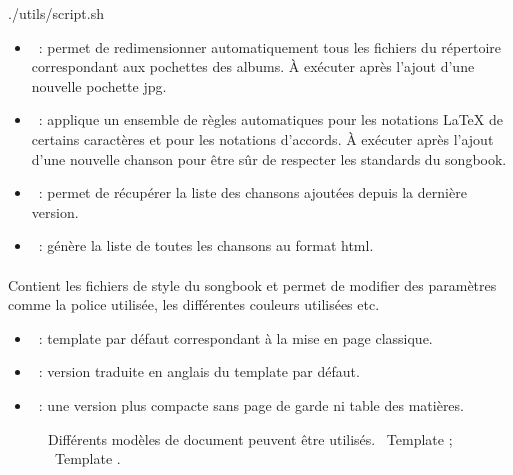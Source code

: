 \begin{unix}
  ./utils/script.sh
\end{unix}

\begin{itemize}
\item {}~: permet de redimensionner
  automatiquement tous les fichiers  du répertoire
   correspondant aux pochettes des albums. À
  exécuter après l'ajout d'une nouvelle pochette jpg.

\item {}~: applique un ensemble de règles
  automatiques pour les notations \LaTeX{} de certains caractères et
  pour les notations d'accords. À exécuter après l'ajout d'une
  nouvelle chanson pour être sûr de respecter les standards du
  songbook.

\item {}~: permet de récupérer la liste des
  chansons ajoutées depuis la dernière version.

\item {}~: génère la liste de toutes les chansons au
  format html.
\end{itemize}

\paragraph{}
Contient les fichiers de style du songbook et permet de modifier des
paramètres comme la police utilisée, les différentes couleurs
utilisées etc.

\begin{itemize}
\item {}~: template par défaut correspondant à la
  mise en page classique.
\item {}~: version traduite en anglais du
  template par défaut.
\item {}~: une version plus compacte sans page de
  garde ni table des matières.
\end{itemize}

\begin{figure}
  \centering
  \hspace{0.1cm}%
  \caption[Templates]{%
    Différents modèles de document peuvent être utilisés.
    ~Template ; %
    ~Template .%
  }%
  \label{fig:templates}
\end{figure}


